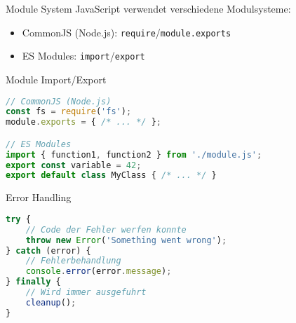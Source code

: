 \begin{concept}{Module System}
    JavaScript verwendet verschiedene Modulsysteme:
    \begin{itemize}
        \item CommonJS (Node.js): \texttt{require}/\texttt{module.exports}
        \item ES Modules: \texttt{import}/\texttt{export}
    \end{itemize}
\end{concept}

\begin{KR}{Module Import/Export}
\begin{lstlisting}[language=JavaScript, style=basesmol]
// CommonJS (Node.js)
const fs = require('fs');
module.exports = { /* ... */ };

// ES Modules
import { function1, function2 } from './module.js';
export const variable = 42;
export default class MyClass { /* ... */ }
\end{lstlisting}
\end{KR}

\begin{KR}{Error Handling}
\begin{lstlisting}[language=JavaScript, style=basesmol]
try {
    // Code der Fehler werfen konnte
    throw new Error('Something went wrong');
} catch (error) {
    // Fehlerbehandlung
    console.error(error.message);
} finally {
    // Wird immer ausgefuhrt
    cleanup();
}
\end{lstlisting}
\end{KR}